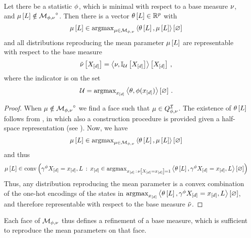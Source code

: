 \begin{theorem}
    \label{the:faceToArgmax}
    Let there be a statistic $\phi$, which is minimal with respect to a base measure $\nu$, and $\mu\left[L\right]\notin{\mathcal{M}_{\phi,\nu}}^{\circ}$.
    Then there is a vector $\theta\left[L\right]\in\mathbb{R}^{p}$ with
    \begin{align*}
        \mu\left[L\right]\in\mathrm{argmax}_{\mu\in\mathcal{M}_{\phi,\nu}}\left\langle \theta\left[L\right],\mu\left[L\right]\right\rangle \left[ \varnothing \right]
    \end{align*}
    and all distributions reproducing the mean parameter $\mu\left[L\right]$ are representable with respect to the base measure
    \begin{align*}
        \tilde{\nu}\left[X_{[d]}\right] = \left\langle \nu, \mathbb{I}_{\mathcal{U}}\left[X_{[d]}\right]\right\rangle \left[ X_{[d]} \right] \, ,
    \end{align*}
    where the indicator is on the set
    \begin{align*}
        \mathcal{U} = \mathrm{argmax}_{x_{[d]}}\left\langle \theta,\phi(x_{[d]})\right\rangle \left[ \varnothing \right]  \, .
    \end{align*}
\end{theorem}
\begin{proof}
    When $\mu\notin{\mathcal{M}_{\phi,\nu}}^{\circ}$ we find a face such that $\mu\in Q^{\mathcal{I}}_{\phi,\nu}$.
    The existence of $\theta\left[L\right]$ follows from , in which also a construction procedure is provided given a half-space representation (see ).
    Now, we have
    \begin{align*}
        \mu\left[L\right] \in \mathrm{argmax}_{\mu\in\mathcal{M}_{\phi,\nu}}\left\langle \theta\left[L\right],\mu\left[L\right]\right\rangle \left[ \varnothing \right]
    \end{align*}
    and thus
    \begin{align*}
        \mu\left[L\right] \in \mathrm{conv}\left( \gamma^{\phi}{X_{[d]}=x_{[d]},L} \, : \,
        x_{[d]} \in \mathrm{argmax}_{x_{[d]} \, : \, \nu\left[X_{[d]}=x_{[d]}\right]=1} \left\langle \theta\left[L\right],\gamma^{\phi}{X_{[d]}=x_{[d]},L}\right\rangle \left[ \varnothing \right] \right)
    \end{align*}
    Thus, any distribution reproducing the mean parameter is a convex combination of the one-hot encodings of the states in $\mathrm{argmax}_{x_{[d]}} \left\langle \theta\left[L\right],\gamma^{\phi}{X_{[d]}=x_{[d]},L}\right\rangle \left[ \varnothing \right]$, and therefore representable with respect to the base measure $\tilde{\nu}$.
\end{proof}

Each face of $\mathcal{M}_{\phi,\nu}$ thus defines a refinement of a base measure, which is sufficient to reproduce the mean parameters on that face.

